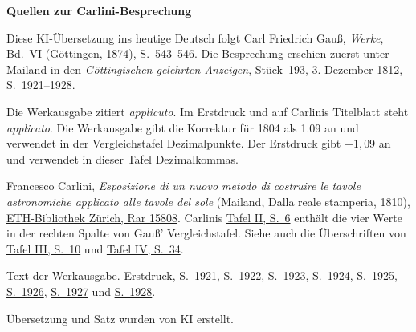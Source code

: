 \clearpage\thispagestyle{empty}
\begin{center}\textbf{Quellen zur Carlini-Besprechung}\end{center}
\noindent Diese KI-Übersetzung ins heutige Deutsch folgt Carl Friedrich Gauß, \textit{Werke}, Bd.~VI (Göttingen, 1874), S.~543--546. Die Besprechung erschien zuerst unter Mailand in den \textit{Göttingischen gelehrten Anzeigen}, Stück~193, 3. Dezember 1812, S.~1921--1928.
\par\smallskip\noindent Die Werkausgabe zitiert \textit{applicuto}. Im Erstdruck und auf Carlinis Titelblatt steht \textit{applicato}. Die Werkausgabe gibt die Korrektur für 1804 als 1.09 an und verwendet in der Vergleichstafel Dezimalpunkte. Der Erstdruck gibt \(+1{,}09\) an und verwendet in dieser Tafel Dezimalkommas.
\par\smallskip\noindent Francesco Carlini, \textit{Esposizione di un nuovo metodo di costruire le tavole astronomiche applicato alle tavole del sole} (Mailand, Dalla reale stamperia, 1810), \href{https://doi.org/10.3931/e-rara-49134}{ETH-Bibliothek Zürich, Rar 15808}. Carlinis \href{https://www.e-rara.ch/i3f/v20/13473455/full/1650,/0/default.jpg}{Tafel II, S.~6} enthält die vier Werte in der rechten Spalte von Gauß' Vergleichstafel. Siehe auch die Überschriften von \href{https://www.e-rara.ch/i3f/v20/13473459/full/1650,/0/default.jpg}{Tafel III, S.~10} und \href{https://www.e-rara.ch/i3f/v20/13473483/full/1650,/0/default.jpg}{Tafel IV, S.~34}.
\par\smallskip\noindent \href{https://gdz.sub.uni-goettingen.de/id/PPN236007467}{Text der Werkausgabe}. Erstdruck, \href{https://images.p.sub.uni-goettingen.de/iiif/image/gdz:PPN319721507_1812:00001965/full/1650,/0/default.jpg}{S.~1921}, \href{https://images.p.sub.uni-goettingen.de/iiif/image/gdz:PPN319721507_1812:00001966/full/1650,/0/default.jpg}{S.~1922}, \href{https://images.p.sub.uni-goettingen.de/iiif/image/gdz:PPN319721507_1812:00001967/full/1650,/0/default.jpg}{S.~1923}, \href{https://images.p.sub.uni-goettingen.de/iiif/image/gdz:PPN319721507_1812:00001968/full/1650,/0/default.jpg}{S.~1924}, \href{https://images.p.sub.uni-goettingen.de/iiif/image/gdz:PPN319721507_1812:00001969/full/1650,/0/default.jpg}{S.~1925}, \href{https://images.p.sub.uni-goettingen.de/iiif/image/gdz:PPN319721507_1812:00001970/full/1650,/0/default.jpg}{S.~1926}, \href{https://images.p.sub.uni-goettingen.de/iiif/image/gdz:PPN319721507_1812:00001971/full/1650,/0/default.jpg}{S.~1927} und \href{https://images.p.sub.uni-goettingen.de/iiif/image/gdz:PPN319721507_1812:00001972/full/1650,/0/default.jpg}{S.~1928}.
\par\smallskip\noindent Übersetzung und Satz wurden von KI erstellt.
\clearpage
